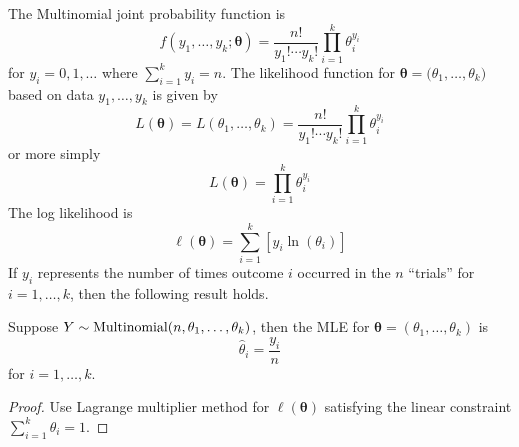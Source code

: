 The Multinomial joint probability function is
\[ f(y_1,\ldots ,y_k;\bm{\theta})=\frac{n!}{y_1!\cdots y_k!}\prod_{i=1}^k \theta_i^{y_i} \]
for $ y_i=0,1,\ldots $ where $ \sum\limits_{i=1}^{k} y_i = n $.
The likelihood function for $ \bm{\theta}=\bm(\theta_1,\ldots ,\theta_k) $ based on data
$ y_1,\ldots ,y_k $ is given by
\[ L(\bm{\theta})=L(\theta_1,\ldots ,\theta_k)=\frac{n!}{y_1!\cdots y_k!} \prod_{i=1}^k
    \theta_i^{y_i} \]
or more simply
\[ L(\bm{\theta})=\prod_{i=1}^k \theta_i^{y_i} \]
The log likelihood is
\[ \ell(\bm{\theta})=\sum\limits_{i=1}^{k} \left[ y_i\ln(\theta_i) \right] \]
If $ y_i $ represents the number of times outcome $ i $ occurred in the $ n $ ``trials''
for $ i=1,\ldots ,k $, then the following result holds.
\begin{thmbox}
    \begin{prop}
        Suppose $ Y \sim \operatorname{Multinomial}(n,\theta_1,\ldots ,\theta_k) $, then the MLE for
        $ \bm{\theta}=(\theta_1,\ldots ,\theta_k) $ is
        \[ \hat{\theta}_i=\frac{y_i}{n} \]
        for $ i=1,\ldots ,k $.
    \end{prop}
\end{thmbox}
\begin{proof}
    Use Lagrange multiplier method for $ \ell(\bm{\theta}) $ satisfying the linear
    constraint $ \sum\limits_{i=1}^{k} \theta_i=1 $.
\end{proof}

